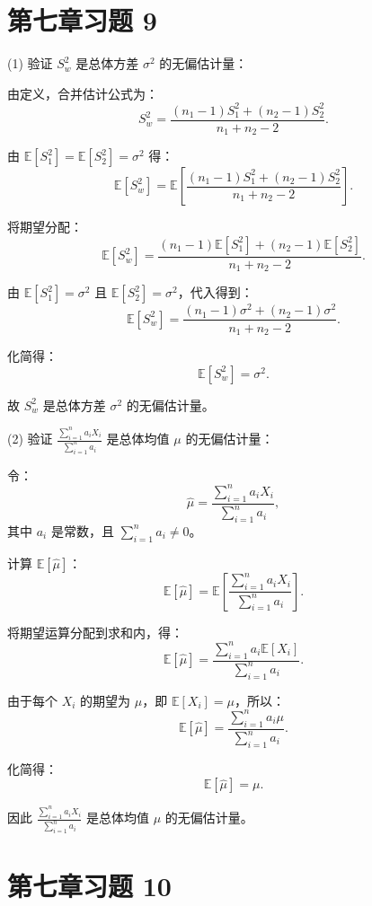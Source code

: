 \documentclass[twoside]{article}
\begin{document}
\section{第七章习题 9}

\begin{ans}{9}{9}
(1) 验证 \( S_w^2 \) 是总体方差 \(\sigma^2\) 的无偏估计量：

由定义，合并估计公式为：
\[
S_w^2 = \frac{(n_1-1)S_1^2 + (n_2-1)S_2^2}{n_1 + n_2 - 2}.
\]

由 \(\mathbb{E}[S_1^2] = \mathbb{E}[S_2^2] = \sigma^2\) 得：
\[
\mathbb{E}[S_w^2] = \mathbb{E} \left[ \frac{(n_1-1)S_1^2 + (n_2-1)S_2^2}{n_1 + n_2 - 2} \right].
\]

将期望分配：
\[
\mathbb{E}[S_w^2] = \frac{(n_1-1)\mathbb{E}[S_1^2] + (n_2-1)\mathbb{E}[S_2^2]}{n_1 + n_2 - 2}.
\]

由 \(\mathbb{E}[S_1^2] = \sigma^2\) 且 \(\mathbb{E}[S_2^2] = \sigma^2\)，代入得到：
\[
\mathbb{E}[S_w^2] = \frac{(n_1-1)\sigma^2 + (n_2-1)\sigma^2}{n_1 + n_2 - 2}.
\]

化简得：
\[
\mathbb{E}[S_w^2] = \sigma^2.
\]

故 \( S_w^2 \) 是总体方差 \(\sigma^2\) 的无偏估计量。

(2) 验证 \(\frac{\sum_{i=1}^n a_i X_i}{\sum_{i=1}^n a_i}\) 是总体均值 \(\mu\) 的无偏估计量：

令：
\[
\hat{\mu} = \frac{\sum_{i=1}^n a_i X_i}{\sum_{i=1}^n a_i},
\]
其中 \( a_i \) 是常数，且 \(\sum_{i=1}^n a_i \neq 0\)。

计算 \(\mathbb{E}[\hat{\mu}]\)：
\[
\mathbb{E}[\hat{\mu}] = \mathbb{E} \left[ \frac{\sum_{i=1}^n a_i X_i}{\sum_{i=1}^n a_i} \right].
\]

将期望运算分配到求和内，得：
\[
\mathbb{E}[\hat{\mu}] = \frac{\sum_{i=1}^n a_i \mathbb{E}[X_i]}{\sum_{i=1}^n a_i}.
\]

由于每个 \( X_i \) 的期望为 \(\mu\)，即 \(\mathbb{E}[X_i] = \mu\)，所以：
\[
\mathbb{E}[\hat{\mu}] = \frac{\sum_{i=1}^n a_i \mu}{\sum_{i=1}^n a_i}.
\]

化简得：
\[
\mathbb{E}[\hat{\mu}] = \mu.
\]

因此 \(\frac{\sum_{i=1}^n a_i X_i}{\sum_{i=1}^n a_i}\) 是总体均值 \(\mu\) 的无偏估计量。


\end{ans}

\section{第七章习题 10}
\end{document}
